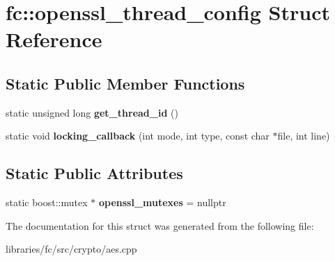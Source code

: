 \hypertarget{structfc_1_1openssl__thread__config}{}\section{fc\+:\+:openssl\+\_\+thread\+\_\+config Struct Reference}
\label{structfc_1_1openssl__thread__config}
\subsection*{Static Public Member Functions}
\begin{DoxyCompactItemize}
\item 
\mbox{\label{structfc_1_1openssl__thread__config_a3eb21f1b5b89756f25f7fca5954ecd1c}} 
static unsigned long {\bfseries get\+\_\+thread\+\_\+id} ()
\item 
\mbox{\label{structfc_1_1openssl__thread__config_adb225520f8f74a6e33321432cb4b938b}} 
static void {\bfseries locking\+\_\+callback} (int mode, int type, const char $\ast$file, int line)
\end{DoxyCompactItemize}
\subsection*{Static Public Attributes}
\begin{DoxyCompactItemize}
\item 
\mbox{\label{structfc_1_1openssl__thread__config_a6c38e892cd30cbedf987cb42d4b04715}} 
static boost\+::mutex $\ast$ {\bfseries openssl\+\_\+mutexes} = nullptr
\end{DoxyCompactItemize}


The documentation for this struct was generated from the following file\+:\begin{DoxyCompactItemize}
\item 
libraries/fc/src/crypto/aes.\+cpp\end{DoxyCompactItemize}
